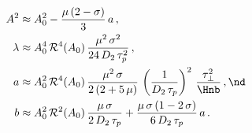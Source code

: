 \begin{subequations} \label{eqn:mflt_approx_analytic}
    \begin{align}
        \label{eqn:mflt_approx_amplitude} A^2 &\approx A_0^2 - \frac{\mu\, (2 - \sigma)}{3}\, a\, ,\\
        \label{eqn:mflt_approx_lambda} \lambda &\approx A_0^4\, \mathcal{R}^4(A_0)\, \frac{\mu^2\, \sigma^2}{24\, D_2\, \tau_p^2}\, , \\
        \label{eqn:mflt_approx_a} a &\approx A_0^2\, \mathcal{R}^4(A_0)\, \frac{\mu^2\, \sigma}{2\, (2 + 5\, \mu)}\, \left(\frac{1}{D_2\, \tau_p}\right)^2\, \frac{\tau_\perp^2}{\Hnb}\, , \nd \\
        \label{eqn:mflt_approx_b} b &\approx A_0^2\, \mathcal{R}^2(A_0)\, \frac{\mu\, \sigma}{2\, D_2\, \tau_p} + \frac{\mu\, \sigma\, (1 - 2\, \sigma)}{6\, D_2\, \tau_p}\, a\, .
    \end{align}
\end{subequations}

